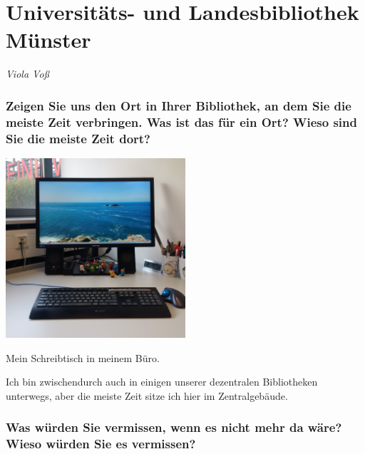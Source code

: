 
\vspace*{.5cm}
\section{Universitäts- und Landesbibliothek Münster}
\begin{center}
\emph{Viola Voß}
\end{center}
\vspace*{1cm}

\hypertarget{zeigen-sie-uns-den-ort-in-ihrer-bibliothek-an-dem-sie-die-meiste-zeit-verbringen.-was-ist-das-fuxfcr-ein-ort-wieso-sind-sie-die-meiste-zeit-dort}{%
\subsubsection*{Zeigen Sie uns den Ort in Ihrer Bibliothek, an dem Sie die
meiste Zeit verbringen. Was ist das für ein Ort? Wieso sind Sie die
meiste Zeit
dort?}\label{zeigen-sie-uns-den-ort-in-ihrer-bibliothek-an-dem-sie-die-meiste-zeit-verbringen.-was-ist-das-fuxfcr-ein-ort-wieso-sind-sie-die-meiste-zeit-dort}}

\begin{center}
\includegraphics[width=0.5\textwidth]{ulb-muenster/img/schreibtisch.jpg}
\end{center}

Mein Schreibtisch in meinem Büro.

Ich bin zwischendurch auch in einigen unserer dezentralen Bibliotheken
unterwegs, aber die meiste Zeit sitze ich hier im Zentralgebäude.

\hypertarget{was-wuxfcrden-sie-vermissen-wenn-es-nicht-mehr-da-wuxe4re-wieso-wuxfcrden-sie-es-vermissen}{%
\subsubsection*{Was würden Sie vermissen, wenn es nicht mehr da wäre? Wieso
würden Sie es
vermissen?}\label{was-wuxfcrden-sie-vermissen-wenn-es-nicht-mehr-da-wuxe4re-wieso-wuxfcrden-sie-es-vermissen}}

